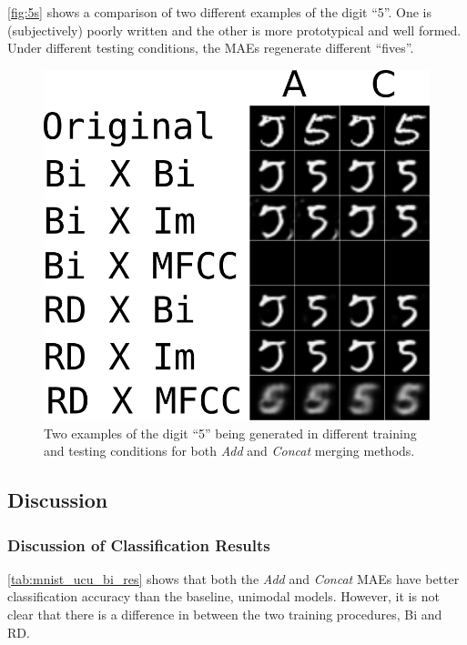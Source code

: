 \autoref{fig:5s} shows a comparison of two different examples of the digit ``5''. One is (subjectively) poorly written and the other is more prototypical and well formed. Under different testing conditions, the MAEs regenerate different ``fives''.

\begin{figure}[h]
\begin{center}
	\includegraphics{Figs/mnistSpoken/5s.png}
	\caption{Two examples of the digit ``5'' being generated in different training and testing conditions for both \textit{Add} and \textit{Concat} merging methods.}
	\label{fig:5s}
\end{center}
\end{figure}



\subsection{Discussion}

\subsubsection{Discussion of Classification Results}
\autoref{tab:mnist_ucu_bi_res} shows that both the \textit{Add} and \textit{Concat} MAEs have better classification accuracy than the baseline, unimodal models. However, it is not clear that there is a difference in between the two training procedures, Bi and RD.

